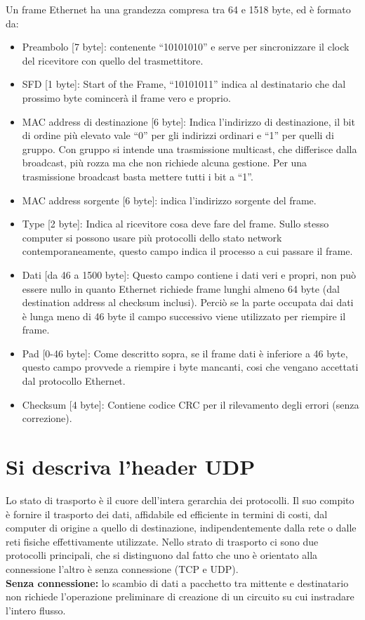 Un frame Ethernet ha una grandezza compresa tra 64 e 1518 byte, ed è formato da:
\begin{itemize}
\item	Preambolo [7 byte]: contenente “10101010” e serve per sincronizzare il clock del ricevitore con quello del trasmettitore.
\item	SFD [1 byte]: Start of the Frame, “10101011” indica al destinatario che dal prossimo byte comincerà il frame vero e proprio.
\item	MAC address di destinazione [6 byte]: Indica l’indirizzo di destinazione, il bit di ordine più elevato vale “0” per gli indirizzi ordinari e “1” per quelli di gruppo. Con gruppo si intende una trasmissione multicast, che differisce dalla broadcast, più rozza ma che non richiede alcuna gestione. Per una trasmissione broadcast basta mettere tutti i bit a “1”.
\item	MAC address sorgente [6 byte]: indica l’indirizzo sorgente del frame.
\item	Type [2 byte]: Indica al ricevitore cosa deve fare del frame. Sullo stesso computer si possono usare più protocolli dello stato network contemporaneamente, questo campo indica il processo a cui passare il frame.
\item	Dati [da 46 a 1500 byte]: Questo campo contiene i dati veri e propri, non può essere nullo in quanto Ethernet richiede frame lunghi almeno 64 byte (dal destination address al checksum inclusi). Perciò se la parte occupata dai dati è lunga meno di 46 byte il campo successivo viene utilizzato per riempire il frame.
\item	Pad [0-46 byte]: Come descritto sopra, se il frame dati è inferiore a 46 byte, questo campo provvede a riempire i byte mancanti, cosi che vengano accettati dal protocollo Ethernet.
\item	Checksum [4 byte]: Contiene codice CRC per il rilevamento degli errori (senza correzione).
\end{itemize}

\section{Si descriva l’header UDP}
Lo stato di trasporto è il cuore dell’intera gerarchia dei protocolli. Il suo compito è fornire il trasporto dei dati, affidabile ed efficiente in termini di costi, dal computer di origine a quello di destinazione, indipendentemente dalla rete o dalle reti fisiche effettivamente utilizzate.
Nello strato di trasporto ci sono due protocolli principali, che si distinguono dal fatto che uno è orientato alla connessione l’altro è senza connessione (TCP e UDP).\\
\textbf{Senza connessione:} lo scambio di dati a pacchetto tra mittente e destinatario non richiede l’operazione preliminare di creazione di un circuito su cui instradare l’intero flusso.

